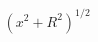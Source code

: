 \documentclass[preview]{standalone}
\begin{document}
\begin{align*}
{(x^2 + R^2)^{1/2}}
\end{align*}
\end{document}

